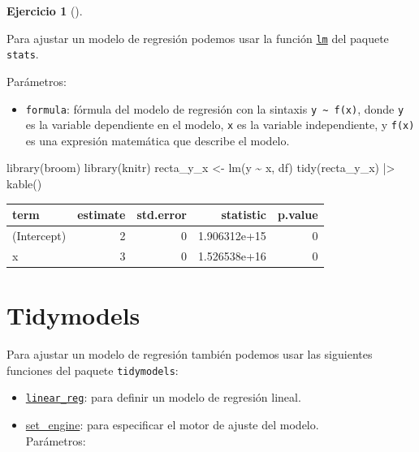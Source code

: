 \documentclass[
  a4paper,
]{scrreport}
\newenvironment{Shaded}{\begin{snugshade}}{\end{snugshade}}
\newcommand{\FunctionTok}[1]{\textcolor[rgb]{0.28,0.35,0.67}{#1}}
\newcommand{\NormalTok}[1]{\textcolor[rgb]{0.00,0.23,0.31}{#1}}
\newcommand{\OtherTok}[1]{\textcolor[rgb]{0.00,0.23,0.31}{#1}}
\newcommand{\SpecialCharTok}[1]{\textcolor[rgb]{0.37,0.37,0.37}{#1}}
\providecommand{\tightlist}{%
  \setlength{\itemsep}{0pt}\setlength{\parskip}{0pt}}\usepackage{longtable,booktabs,array}
\theoremstyle{definition}
\newtheorem{exercise}{Ejercicio}[chapter]
\theoremstyle{remark}
\begin{document}
\begin{exercise}[]
\begin{enumerate}
\begin{tcolorbox}
  Para ajustar un modelo de regresión podemos usar la función
  \href{https://www.rdocumentation.org/packages/stats/versions/3.6.2/topics/lm}{\texttt{lm}}
  del paquete \texttt{stats}.

  Parámetros:

  \begin{itemize}
  \tightlist
  \item
    \texttt{formula}: fórmula del modelo de regresión con la sintaxis
    \texttt{y\ \textasciitilde{}\ f(x)}, donde \texttt{y} es la variable
    dependiente en el modelo, \texttt{x} es la variable independiente, y
    \texttt{f(x)} es una expresión matemática que describe el modelo.
  \end{itemize}

\begin{Shaded}
\begin{Highlighting}[]
\FunctionTok{library}\NormalTok{(broom)}
\FunctionTok{library}\NormalTok{(knitr)}
\NormalTok{recta\_y\_x }\OtherTok{\textless{}{-}} \FunctionTok{lm}\NormalTok{(y }\SpecialCharTok{\textasciitilde{}}\NormalTok{ x, df) }
\FunctionTok{tidy}\NormalTok{(recta\_y\_x) }\SpecialCharTok{|\textgreater{}} \FunctionTok{kable}\NormalTok{()}
\end{Highlighting}
\end{Shaded}

  \begin{longtable}[]{@{}lrrrr@{}}
  \toprule\noalign{}
  term & estimate & std.error & statistic & p.value \\
  \midrule\noalign{}
  \endhead
  \bottomrule\noalign{}
  \endlastfoot
  (Intercept) & 2 & 0 & 1.906312e+15 & 0 \\
  x & 3 & 0 & 1.526538e+16 & 0 \\
  \end{longtable}

  \section{Tidymodels}

  Para ajustar un modelo de regresión también podemos usar las
  siguientes funciones del paquete \texttt{tidymodels}:

  \begin{itemize}
  \tightlist
  \item
    \href{https://www.tidymodels.org/find/model_regression_linear_reg/}{\texttt{linear\_reg}}:
    para definir un modelo de regresión lineal.
  \item
    \href{https://www.tidymodels.org/find/engine_set_engine/}{set\_engine}:
    para especificar el motor de ajuste del modelo.\\
    Parámetros:


\end{itemize}
\end{tcolorbox}
\end{enumerate}
\end{exercise}
\end{document}
